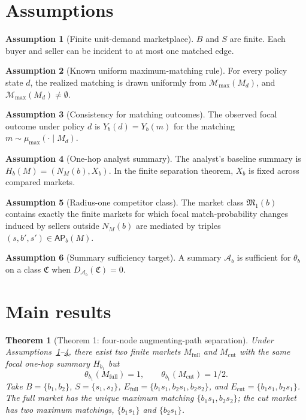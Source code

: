 \documentclass[11pt]{article}
\theoremstyle{definition}
\newtheorem{assumption}{Assumption}
\theoremstyle{plain}
\newtheorem{theorem}{Theorem}
\theoremstyle{remark}
\begin{document}
\section{Assumptions}
\begin{assumption}[Finite unit-demand marketplace]\label{ass:finite-market}
\(B\) and \(S\) are finite.  Each buyer and seller can be incident to at most one matched edge.
\end{assumption}

\begin{assumption}[Known uniform maximum-matching rule]\label{ass:uniform-max}
For every policy state \(d\), the realized matching is drawn uniformly from \(\mathcal M_{\max}(M_d)\), and \(\mathcal M_{\max}(M_d)\ne\emptyset\).
\end{assumption}

\begin{assumption}[Consistency for matching outcomes]\label{ass:consistency}
The observed focal outcome under policy \(d\) is \(Y_b(d)=Y_b(m)\) for the matching \(m\sim\mu_{\max}(\cdot\mid M_d)\).
\end{assumption}

\begin{assumption}[One-hop analyst summary]\label{ass:one-hop}
The analyst's baseline summary is \(H_b(M)=(N_M(b),X_b)\).  In the finite separation theorem, \(X_b\) is fixed across compared markets.
\end{assumption}

\begin{assumption}[Radius-one competitor class]\label{ass:radius-one}
The market class \(\mathfrak M_1(b)\) contains exactly the finite markets for which focal match-probability changes induced by sellers outside \(N_M(b)\) are mediated by triples \((s,b',s')\in\mathsf{AP}_b(M)\).
\end{assumption}

\begin{assumption}[Summary sufficiency target]\label{ass:suff-target}
A summary \(\mathcal A_b\) is sufficient for \(\theta_b\) on a class \(\mathfrak C\) when \(D_{\mathcal A_b}(\mathfrak C)=0\).
\end{assumption}

\section{Main results}
\begin{theorem}[Theorem 1: four-node augmenting-path separation]\label{thm:four-node}
Under Assumptions~\ref{ass:finite-market}--\ref{ass:one-hop}, there exist two finite markets \(M_{\mathrm{full}}\) and \(M_{\mathrm{cut}}\) with the same focal one-hop summary \(H_{b_1}\) but
\[
\theta_{b_1}(M_{\mathrm{full}})=1,\qquad
\theta_{b_1}(M_{\mathrm{cut}})=1/2.
\]
Take \(B=\{b_1,b_2\}\), \(S=\{s_1,s_2\}\), \(E_{\mathrm{full}}=\{b_1s_1,b_2s_1,b_2s_2\}\), and \(E_{\mathrm{cut}}=\{b_1s_1,b_2s_1\}\).  The full market has the unique maximum matching \(\{b_1s_1,b_2s_2\}\); the cut market has two maximum matchings, \(\{b_1s_1\}\) and \(\{b_2s_1\}\).
\end{theorem}
\end{document}
